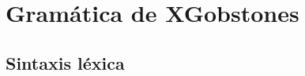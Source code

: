 \documentclass{article}
\begin{document}
\newcommand{\chr}[1]{\texttt{'}\textcolor{blue}{\texttt{#1}}\texttt{'}}
\newcommand{\str}[1]{\texttt{"}\textcolor{blue}{\texttt{#1}}\texttt{"}}
\newcommand{\tok}[1]{\textcolor{red}{\texttt{#1}}}
\newcommand{\symbolentry}[3]{#1 & #2 && #3 \\}
\newcommand{\nb}[1]{\footnotesize{#1}}
\newcommand{\NB}[1]{
  & {\footnotesize {#1}}
}
\newcommand{\s}[1]{\textcolor{blue}{{\it$\langle$#1$\rangle$}}}
\newcommand{\nonEmpty}[1]{#1$_{1}$}
\newcommand{\produccion}[2]{
  \noindent
  \begin{tabularx}{\textwidth}{lrlr}
  #1 & $\xrightarrow{\hspace{.5cm}}$ & #2
  \end{tabularx}\\
}
\newcommand{\EMPTY}{$\epsilon$}
\newcommand{\ALT}{
  \\ & $\mid$ &
}
\newcommand{\ALTA}{
  $\mid$
}
\newcommand{\TODO}[1]{\textcolor{red}{****#1****}}

\newcommand{\type}[1]{\textcolor{blue}{\texttt{#1}}}
\renewcommand{\ast}[1]{\textcolor{darkgreen}{\texttt{\underline{#1}}}}
\newcommand{\typedecl}[2]{\noindent
  \begin{tabularx}{\textwidth}{lrlr}
  #1 & $=$ & #2
  \end{tabularx}\\
}
\newcommand{\datadecl}[2]{\noindent
  \begin{tabularx}{\textwidth}{lrp{13cm}r}
  #1 & $::=$ & #2
  \end{tabularx}\\
}

\newcommand{\PUEDE}{{\bf PUEDE}\xspace}
\newcommand{\PUEDEN}{{\bf PUEDEN}\xspace}
\newcommand{\NOPUEDE}{{\bf NO PUEDE}\xspace}
\newcommand{\NOPUEDEN}{{\bf NO PUEDEN}\xspace}
\newcommand{\DEBE}{{\bf DEBE}\xspace}
\newcommand{\DEBEN}{{\bf DEBEN}\xspace}

\section{Gram\'atica de XGobstones}

\subsection{Sintaxis l\'exica}
\end{document}
